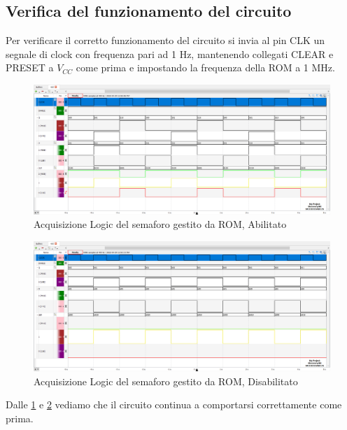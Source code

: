 \documentclass[10pt, a4paper, italian]{article}
\begin{document}
\subsection{Verifica del funzionamento del circuito}
Per verificare il corretto funzionamento del circuito si invia al pin CLK un
segnale di clock con frequenza pari ad 1 Hz, mantenendo collegati CLEAR e
PRESET a $V_{CC}$ come prima e impostando la frequenza della ROM a 1 MHz.
\begin{figure}[htbp]
    \centering
    \includegraphics[width=\textwidth]{es2.enable}
    \caption{Acquisizione Logic del semaforo gestito da ROM, Abilitato
    \label{fig: es.2_enable}}
\end{figure}
\begin{figure}[htbp]
    \centering
    \includegraphics[width=\textwidth]{es2.disable}
    \caption{Acquisizione Logic del semaforo gestito da ROM, Disabilitato
    \label{fig: es.2_disable}}
\end{figure}
Dalle \cref{fig: es.2_enable} e \cref{fig: es.2_disable} vediamo che il
circuito continua a comportarsi correttamente come prima.
\end{document}
